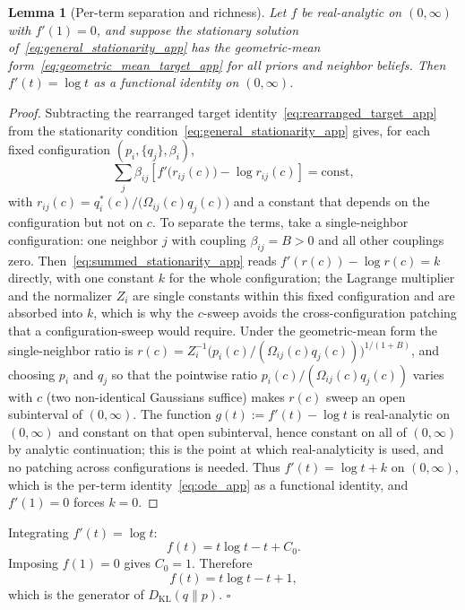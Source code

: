 \documentclass[11pt]{article}
\newtheorem{lemma}{Lemma}
\begin{document}
\begin{lemma}[Per-term separation and richness]
\label{lem:richness_app}
Let $f$ be real-analytic on $(0, \infty)$ with $f'(1) = 0$, and suppose the stationary solution of~\eqref{eq:general_stationarity_app} has the geometric-mean form~\eqref{eq:geometric_mean_target_app} for all priors and neighbor beliefs. Then $f'(t) = \log t$ as a functional identity on $(0, \infty)$.
\end{lemma}

\begin{proof}
Subtracting the rearranged target identity~\eqref{eq:rearranged_target_app} from the stationarity condition~\eqref{eq:general_stationarity_app} gives, for each fixed configuration $(p_i, \{q_j\}, \beta_i)$,
\begin{equation}
\sum_j \beta_{ij}\left[f'\big(r_{ij}(c)\big) - \log r_{ij}(c)\right] = \text{const},
\label{eq:summed_stationarity_app}
\end{equation}
with $r_{ij}(c) = q_i^*(c)/\big(\Omega_{ij}(c)q_j(c)\big)$ and a constant that depends on the configuration but not on $c$. To separate the terms, take a single-neighbor configuration: one neighbor $j$ with coupling $\beta_{ij} = B > 0$ and all other couplings zero. Then~\eqref{eq:summed_stationarity_app} reads $f'(r(c)) - \log r(c) = k$ directly, with one constant $k$ for the whole configuration; the Lagrange multiplier and the normalizer $Z_i$ are single constants within this fixed configuration and are absorbed into $k$, which is why the $c$-sweep avoids the cross-configuration patching that a configuration-sweep would require. Under the geometric-mean form the single-neighbor ratio is $r(c) = Z_i^{-1}\big(p_i(c)/(\Omega_{ij}(c)q_j(c))\big)^{1/(1+B)}$, and choosing $p_i$ and $q_j$ so that the pointwise ratio $p_i(c)/(\Omega_{ij}(c)q_j(c))$ varies with $c$ (two non-identical Gaussians suffice) makes $r(c)$ sweep an open subinterval of $(0, \infty)$. The function $g(t) := f'(t) - \log t$ is real-analytic on $(0, \infty)$ and constant on that open subinterval, hence constant on all of $(0, \infty)$ by analytic continuation; this is the point at which real-analyticity is used, and no patching across configurations is needed. Thus $f'(t) = \log t + k$ on $(0, \infty)$, which is the per-term identity~\eqref{eq:ode_app} as a functional identity, and $f'(1) = 0$ forces $k = 0$.
\end{proof}

Integrating $f'(t) = \log t$:
\[
f(t) = t\log t - t + C_0.
\]
Imposing $f(1)=0$ gives $C_0 = 1$. Therefore
\[
f(t) = t\log t - t + 1,
\]
which is the generator of $D_{\mathrm{KL}}(q\|p)$. \hfill $\square$
\end{document}
